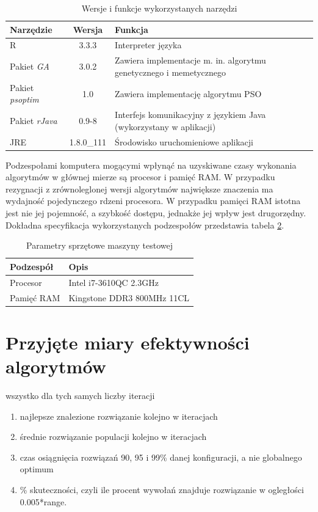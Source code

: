 \begin{table}[hb]
\label{tab:wykorzystane_narzedzia}
\caption{Wersje i funkcje wykorzystanych narzędzi}
\begin{tabularx}{\textwidth}{|l|c|X|}
	\hline
	Narzędzie & Wersja & Funkcja \\
	\hline
	R & 3.3.3 & Interpreter języka \\
	Pakiet \emph{GA} & 3.0.2 & Zawiera implementacje m. in. algorytmu genetycznego i memetycznego \\
	Pakiet \emph{psoptim} & 1.0 & Zawiera implementację algorytmu PSO \\
	Pakiet \emph{rJava} & 0.9-8 & Interfejs komunikacyjny z językiem Java (wykorzystany w aplikacji) \\
	JRE & 1.8.0\_111 & Środowisko uruchomieniowe aplikacji \\
	\hline
	\end{tabularx}
\end{table}
\par
Podzespołami komputera mogącymi wpłynąć na uzyskiwane czasy wykonania algorytmów w głównej mierze są procesor i pamięć RAM. W przypadku rezygnacji z zrównoleglonej wersji algorytmów największe znaczenia ma wydajność pojedynczego rdzeni procesora. W przypadku pamięci RAM istotna jest nie jej pojemność, a szybkość dostępu, jednakże jej wpływ jest drugorzędny. Dokładna specyfikacja wykorzystanych podzespołów przedstawia tabela \ref{table:parametry_komputera}.
\begin{table}[hb]
\caption{Parametry sprzętowe maszyny testowej}
\label{table:parametry_komputera}
\begin{center}
\begin{tabular}{|l|l|}
	\hline
	Podzespół & Opis \\
	\hline
	Procesor & Intel i7-3610QC 2.3GHz \\
	Pamięć RAM & Kingstone DDR3 800MHz 11CL \\
	\hline
	\end{tabular}
\end{center}
\end{table}



\section{Przyjęte miary efektywności algorytmów}
\label{sec:przyjete_miary_efektywnosci_algorytmow}
wszystko dla tych samych liczby iteracji
\begin{enumerate}
\item najlepsze znalezione rozwiązanie kolejno w iteracjach
\item średnie rozwiązanie populacji kolejno w iteracjach
\item czas osiągnięcia rozwiązań 90, 95 i 99\% danej konfiguracji, a nie globalnego optimum
\item \% skuteczności, czyli ile procent wywołań znajduje rozwiązanie w ogległości 0.005*range.
\end{enumerate}




